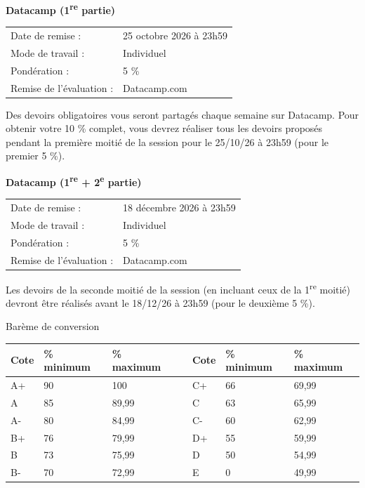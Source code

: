 \documentclass[10pt]{article}
\newcommand{\ulsub}[1]{%
  \needspace{3\baselineskip}%
  \vspace{10pt}%
  {\headfont\fontsize{12.5}{15}\selectfont #1}\par
  \vspace{2pt}%
}
\newcommand{\ulsubsub}[1]{%
  \needspace{3\baselineskip}%
  \vspace{8pt}%
  {\headfont\fontsize{11}{13}\selectfont\bfseries #1}\par
  \vspace{1pt}%
}
\begin{document}
\ulsubsub{Datacamp (1\textsuperscript{re} partie)}
{\fontsize{9.5}{12.5}\selectfont
\begin{tabular}{@{}L{1.9in}L{5.4in}@{}}
Date de remise : & 25 octobre 2026 à 23h59\\
Mode de travail : & Individuel\\
Pondération : & 5 \%\\
Remise de l'évaluation : & Datacamp.com\\
\end{tabular}\par
\vspace{4pt}
Des devoirs obligatoires vous seront partagés chaque semaine sur Datacamp. Pour obtenir votre 10 \% complet, vous devrez réaliser tous les devoirs proposés pendant la première moitié de la session pour le 25/10/26 à 23h59 (pour le premier 5 \%).\par}

\ulsubsub{Datacamp (1\textsuperscript{re} + 2\textsuperscript{e} partie)}
{\fontsize{9.5}{12.5}\selectfont
\begin{tabular}{@{}L{1.9in}L{5.4in}@{}}
Date de remise : & 18 décembre 2026 à 23h59\\
Mode de travail : & Individuel\\
Pondération : & 5 \%\\
Remise de l'évaluation : & Datacamp.com\\
\end{tabular}\par
\vspace{4pt}
Les devoirs de la seconde moitié de la session (en incluant ceux de la 1\textsuperscript{re} moitié) devront être réalisés avant le 18/12/26 à 23h59 (pour le deuxième 5 \%).\par}

\vspace{10pt}
\ulsub{Barème de conversion}
{\setlength{\arrayrulewidth}{0.4pt}\fontsize{9.5}{12}\selectfont
\noindent\begin{tabular}{|L{0.7in}|L{1.05in}|L{1.05in}|L{0.35in}|L{0.7in}|L{1.05in}|L{1.05in}|}
\hline
{}Cote & \% minimum & \% maximum &  & Cote & \% minimum & \% maximum\\
\hline
A+ & 90 & 100 & & C+ & 66 & 69,99\\
\hline
A & 85 & 89,99 & & C & 63 & 65,99\\
\hline
A- & 80 & 84,99 & & C- & 60 & 62,99\\
\hline
B+ & 76 & 79,99 & & D+ & 55 & 59,99\\
\hline
B & 73 & 75,99 & & D & 50 & 54,99\\
\hline
B- & 70 & 72,99 & & E & 0 & 49,99\\
\hline
\end{tabular}}
\end{document}
